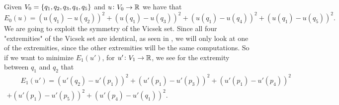 \medskip
\noi Given $V_0 = \cbr{q_1, q_2, q_3, q_4, q_5}$ and $u\colon V_0 \to \mathbb{R}$ we have that
\begin{equation}
	E_0(u) = \left(u(q_1) - u(q_2)\right)^2 + \left(u(q_1) - u(q_3)\right)^2 + \left(u(q_1) - u(q_4)\right)^2 + \left(u(q_1) - u(q_5)\right)^2.
\end{equation} 
We are going to exploit the symmetry of the Vicsek set. Since all four "extremities" of the Vicsek set are identical, as seen in , we will only look at one of the extremities, since the other extremities will be the same computations. So if we want to minimize $E_1(u')$, for $u'\colon V_1 \to \mathbb{R}$, we see for the extremity between $q_1$ and $q_2$ that
\begin{multline}\label{E1Energy}
	\hspace{2em} E_1(u') = \left(u'(q_2) - u'(p_1)\right)^2 + \left(u'(p_1) - u'(p_3)\right)^2 + \left(u'(p_1) - u'(p_4)\right)^2 
	\\ + \left(u'(p_1) - u'(p_5)\right)^2 + \left(u'(p_4) - u'(q_1)\right)^2. \hspace{2em}
\end{multline}


